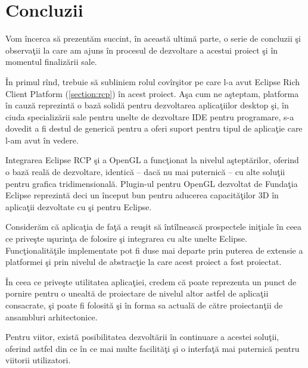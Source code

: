 \chapter{Concluzii}

Vom încerca să prezentăm succint, în această ultimă parte, o serie de concluzii
şi observaţii la care am ajuns în procesul de dezvoltare a acestui proiect şi în
momentul finalizării sale.

În primul rînd, trebuie să subliniem rolul covîrşitor pe care l-a avut Eclipse
Rich Client Platform (\ref{section:rcp}) în acest proiect. Aşa cum ne aşteptam,
platforma în cauză reprezintă o bază solidă pentru dezvoltarea aplicaţiilor
desktop şi, în ciuda specializării sale pentru unelte de dezvoltare IDE pentru
programare, s-a dovedit a fi destul de generică pentru a oferi suport pentru
tipul de aplicaţie care l-am avut în vedere.

Integrarea Eclipse RCP şi a OpenGL a funcţionat la nivelul aşteptărilor, oferind
o bază reală de dezvoltare, identică -- dacă nu mai puternică -- cu alte soluţii
pentru grafica tridimensională. Plugin-ul pentru OpenGL dezvoltat de Fundaţia
Eclipse reprezintă deci un început bun pentru aducerea capacităţilor 3D în
aplicaţii dezvoltate cu şi pentru Eclipse.

Considerăm că aplicaţia de faţă a reuşit să întîlnească prospectele iniţiale în
ceea ce priveşte uşurinţa de folosire şi integrarea cu alte unelte Eclipse.
Funcţionalităţile implementate pot fi duse mai departe prin puterea de extensie
a platformei şi prin nivelul de abstracţie la care acest proiect a fost
proiectat. 

În ceea ce priveşte utilitatea aplicaţiei, credem că poate reprezenta un punct
de pornire pentru o unealtă de proiectare de nivelul altor astfel de aplicaţii
consacrate, şi poate fi folosită şi în forma sa actuală de către proiectanţii de
ansambluri arhitectonice.

Pentru viitor, există posibilitatea dezvoltării în continuare a acestei soluţii,
oferind astfel din ce în ce mai multe facilităţi şi o interfaţă mai puternică
pentru viitorii utilizatori.
